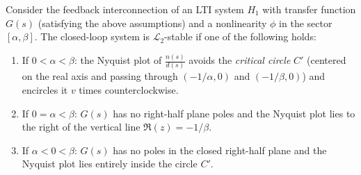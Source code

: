 \begin{theorem}
Consider the feedback interconnection of an LTI system $H_1$ with transfer function $G(s)$ (satisfying the above assumptions) and a nonlinearity $\phi$ in the sector $[\alpha,\beta]$. The closed-loop system is $\mathcal{L}_2$-stable if one of the following holds:
\begin{enumerate}
    \item If $0 < \alpha < \beta$: the Nyquist plot of $\tfrac{n(s)}{d(s)}$ avoids the \emph{critical circle} $C'$ (centered on the real axis and passing through $(-1/\alpha,0)$ and $(-1/\beta,0)$) and encircles it $v$ times counterclockwise.
    \item If $0=\alpha<\beta$: $G(s)$ has no right-half plane poles and the Nyquist plot lies to the right of the vertical line $\Re(z) = -1/\beta$.
    \item If $\alpha<0<\beta$: $G(s)$ has no poles in the closed right-half plane and the Nyquist plot lies entirely inside the circle $C'$.
\end{enumerate}
\centering
{}

\end{theorem}


